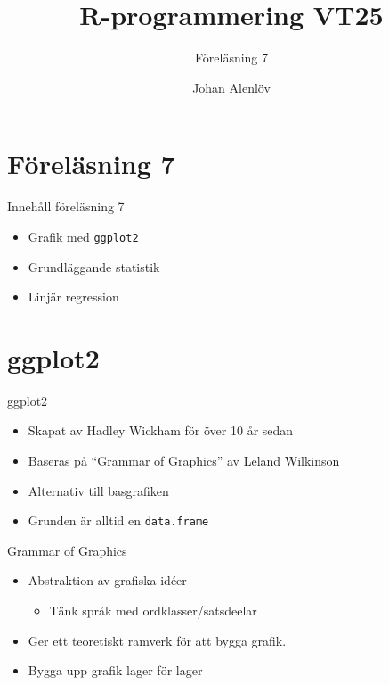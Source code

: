 \documentclass[
  11pt,
  ignorenonframetext,
  handout]{beamer}
\title{R-programmering VT25}
\subtitle{Föreläsning 7}
\author{Johan Alenlöv}
\date{}
\institute{Linköpings Universitet}
\providecommand{\tightlist}{%
  \setlength{\itemsep}{0pt}\setlength{\parskip}{0pt}}
\begin{document}
\frame{\titlepage}

\section{Föreläsning 7}\label{fuxf6reluxe4sning-7}

\begin{frame}{Innehåll föreläsning 7}
\label{innehuxe5ll-fuxf6reluxe4sning-7}
\begin{itemize}
\tightlist
\item
  Grafik med \texttt{ggplot2}
\item
  Grundläggande statistik
\item
  Linjär regression
\end{itemize}
\end{frame}

\section{ggplot2}\label{ggplot2}

\begin{frame}{ggplot2}
\label{ggplot2-1}
\begin{itemize}
\tightlist
\item
  Skapat av Hadley Wickham för över 10 år sedan
\item
  Baseras på ``Grammar of Graphics'' av Leland Wilkinson
\item
  Alternativ till basgrafiken
\item
  Grunden är alltid en \texttt{data.frame}
\end{itemize}
\end{frame}

\begin{frame}{Grammar of Graphics}
\label{grammar-of-graphics}
\begin{itemize}
\tightlist
\item
  Abstraktion av grafiska idéer

  \begin{itemize}
  \tightlist
  \item
    Tänk språk med ordklasser/satsdeelar
  \end{itemize}
\item
  Ger ett teoretiskt ramverk för att bygga grafik.
\item
  Bygga upp grafik lager för lager
\end{itemize}
\end{frame}
\end{document}
